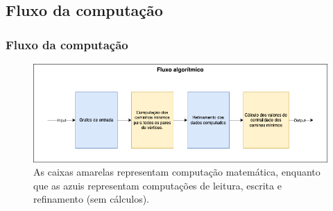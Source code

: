 \documentclass{beamer}
\begin{document}
    \subsection{Fluxo da computação}
        \begin{frame}
            \frametitle{Fluxo da computação}
            \begin{figure}
                \centering
                \includegraphics[scale=0.3]{algorithmic-flow.png}
                \caption{As caixas amarelas representam computação matemática, enquanto que as azuis representam computações de leitura, escrita e refinamento (sem cálculos).}
            \end{figure}
        \end{frame}

\end{document}
